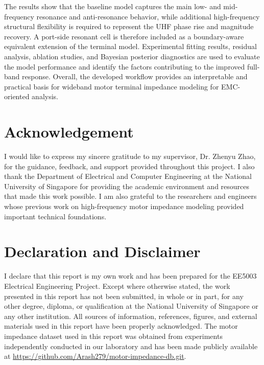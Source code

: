 \documentclass[12pt,a4paper]{article}
\begin{document}
The results show that the baseline model captures the main low- and mid-frequency resonance and anti-resonance behavior, while additional high-frequency structural flexibility is required to represent the UHF phase rise and magnitude recovery. A port-side resonant cell is therefore included as a boundary-aware equivalent extension of the terminal model. Experimental fitting results, residual analysis, ablation studies, and Bayesian posterior diagnostics are used to evaluate the model performance and identify the factors contributing to the improved full-band response. Overall, the developed workflow provides an interpretable and practical basis for wideband motor terminal impedance modeling for EMC-oriented analysis.

\section*{Acknowledgement}

I would like to express my sincere gratitude to my supervisor, Dr. Zhenyu Zhao, for the guidance, feedback, and support provided throughout this project. I also thank the Department of Electrical and Computer Engineering at the National University of Singapore for providing the academic environment and resources that made this work possible. I am also grateful to the researchers and engineers whose previous work on high-frequency motor impedance modeling provided important technical foundations.

\section*{Declaration and Disclaimer}

I declare that this report is my own work and has been prepared for the EE5003 Electrical Engineering Project. Except where otherwise stated, the work presented in this report has not been submitted, in whole or in part, for any other degree, diploma, or qualification at the National University of Singapore or any other institution. All sources of information, references, figures, and external materials used in this report have been properly acknowledged. The motor impedance dataset used in this report was obtained from experiments independently conducted in our laboratory and has been made publicly available at \url{https://github.com/Arash279/motor-impedance-db.git}.
\end{document}
